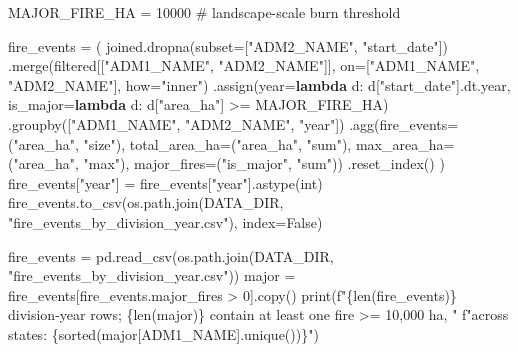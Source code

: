 \documentclass[
  letterpaper,
  DIV=11,
  numbers=noendperiod]{scrartcl}
\newenvironment{Shaded}{\begin{snugshade}}{\end{snugshade}}
\newcommand{\BuiltInTok}[1]{\textcolor[rgb]{0.00,0.23,0.31}{#1}}
\newcommand{\CommentTok}[1]{\textcolor[rgb]{0.37,0.37,0.37}{#1}}
\newcommand{\DecValTok}[1]{\textcolor[rgb]{0.68,0.00,0.00}{#1}}
\newcommand{\KeywordTok}[1]{\textcolor[rgb]{0.00,0.23,0.31}{\textbf{#1}}}
\newcommand{\NormalTok}[1]{\textcolor[rgb]{0.00,0.23,0.31}{#1}}
\newcommand{\OperatorTok}[1]{\textcolor[rgb]{0.37,0.37,0.37}{#1}}
\newcommand{\SpecialCharTok}[1]{\textcolor[rgb]{0.37,0.37,0.37}{#1}}
\newcommand{\SpecialStringTok}[1]{\textcolor[rgb]{0.13,0.47,0.30}{#1}}
\newcommand{\StringTok}[1]{\textcolor[rgb]{0.13,0.47,0.30}{#1}}
\newcommand{\VariableTok}[1]{\textcolor[rgb]{0.07,0.07,0.07}{#1}}
\begin{document}
\begin{Shaded}
\begin{Highlighting}[]
\NormalTok{MAJOR\_FIRE\_HA }\OperatorTok{=} \DecValTok{10000}  \CommentTok{\# landscape{-}scale burn threshold}

\NormalTok{fire\_events }\OperatorTok{=}\NormalTok{ (}
\NormalTok{    joined.dropna(subset}\OperatorTok{=}\NormalTok{[}\StringTok{"ADM2\_NAME"}\NormalTok{, }\StringTok{"start\_date"}\NormalTok{])}
\NormalTok{    .merge(filtered[[}\StringTok{"ADM1\_NAME"}\NormalTok{, }\StringTok{"ADM2\_NAME"}\NormalTok{]], on}\OperatorTok{=}\NormalTok{[}\StringTok{"ADM1\_NAME"}\NormalTok{, }\StringTok{"ADM2\_NAME"}\NormalTok{], how}\OperatorTok{=}\StringTok{"inner"}\NormalTok{)}
\NormalTok{    .assign(year}\OperatorTok{=}\KeywordTok{lambda}\NormalTok{ d: d[}\StringTok{"start\_date"}\NormalTok{].dt.year, is\_major}\OperatorTok{=}\KeywordTok{lambda}\NormalTok{ d: d[}\StringTok{"area\_ha"}\NormalTok{] }\OperatorTok{\textgreater{}=}\NormalTok{ MAJOR\_FIRE\_HA)}
\NormalTok{    .groupby([}\StringTok{"ADM1\_NAME"}\NormalTok{, }\StringTok{"ADM2\_NAME"}\NormalTok{, }\StringTok{"year"}\NormalTok{])}
\NormalTok{    .agg(fire\_events}\OperatorTok{=}\NormalTok{(}\StringTok{"area\_ha"}\NormalTok{, }\StringTok{"size"}\NormalTok{), total\_area\_ha}\OperatorTok{=}\NormalTok{(}\StringTok{"area\_ha"}\NormalTok{, }\StringTok{"sum"}\NormalTok{),}
\NormalTok{         max\_area\_ha}\OperatorTok{=}\NormalTok{(}\StringTok{"area\_ha"}\NormalTok{, }\StringTok{"max"}\NormalTok{), major\_fires}\OperatorTok{=}\NormalTok{(}\StringTok{"is\_major"}\NormalTok{, }\StringTok{"sum"}\NormalTok{))}
\NormalTok{    .reset\_index()}
\NormalTok{)}
\NormalTok{fire\_events[}\StringTok{"year"}\NormalTok{] }\OperatorTok{=}\NormalTok{ fire\_events[}\StringTok{"year"}\NormalTok{].astype(}\BuiltInTok{int}\NormalTok{)}
\NormalTok{fire\_events.to\_csv(os.path.join(DATA\_DIR, }\StringTok{"fire\_events\_by\_division\_year.csv"}\NormalTok{), index}\OperatorTok{=}\VariableTok{False}\NormalTok{)}
\end{Highlighting}
\end{Shaded}

\begin{Shaded}
\begin{Highlighting}[]
\NormalTok{fire\_events }\OperatorTok{=}\NormalTok{ pd.read\_csv(os.path.join(DATA\_DIR, }\StringTok{"fire\_events\_by\_division\_year.csv"}\NormalTok{))}
\NormalTok{major }\OperatorTok{=}\NormalTok{ fire\_events[fire\_events.major\_fires }\OperatorTok{\textgreater{}} \DecValTok{0}\NormalTok{].copy()}
\BuiltInTok{print}\NormalTok{(}\SpecialStringTok{f"}\SpecialCharTok{\{}\BuiltInTok{len}\NormalTok{(fire\_events)}\SpecialCharTok{\}}\SpecialStringTok{ division{-}year rows; }\SpecialCharTok{\{}\BuiltInTok{len}\NormalTok{(major)}\SpecialCharTok{\}}\SpecialStringTok{ contain at least one fire \textgreater{}= 10,000 ha, "}
      \SpecialStringTok{f"across states: }\SpecialCharTok{\{}\BuiltInTok{sorted}\NormalTok{(major[}\StringTok{\textquotesingle{}ADM1\_NAME\textquotesingle{}}\NormalTok{].unique())}\SpecialCharTok{\}}\SpecialStringTok{"}\NormalTok{)}
\end{Highlighting}
\end{Shaded}
\end{document}
